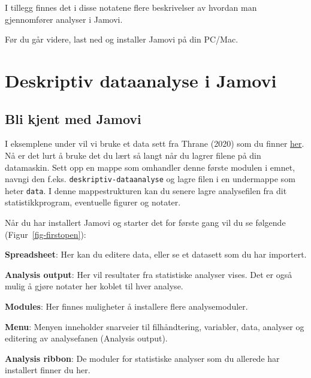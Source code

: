 \documentclass[
  letterpaper,
  DIV=11,
  numbers=noendperiod,
  oneside]{scrreprt}
\begin{document}
I tillegg finnes det i disse notatene flere beskrivelser av hvordan man
gjennomfører analyser i Jamovi.

Før du går videre, last ned og installer Jamovi på din PC/Mac.

\hypertarget{deskriptiv-dataanalyse-i-jamovi}{%
\chapter{Deskriptiv dataanalyse i
Jamovi}\label{deskriptiv-dataanalyse-i-jamovi}}

\hypertarget{bli-kjent-med-jamovi}{%
\section{Bli kjent med Jamovi}\label{bli-kjent-med-jamovi}}

I eksemplene under vil vi bruke et data sett fra Thrane
(2020)
som du finner \href{data/fotball_1_2_3.csv}{her}. Nå er det lurt å bruke
det du lært så langt når du lagrer filene på din datamaskin. Sett opp en
mappe som omhandler denne første modulen i emnet, navngi den f.eks.
\texttt{deskriptiv-dataanalyse} og lagre filen i en undermappe som heter
\texttt{data}. I denne mappestrukturen kan du senere lagre analysefilen
fra dit statistikkprogram, eventuelle figurer og notater.

Når du har installert Jamovi og starter det for første gang vil du se
følgende (Figur~\ref{fig-firstopen}):

{\textbf{Spreadsheet}}: Her kan du editere data, eller se et datasett
som du har importert.

{\textbf{Analysis output}}: Her vil resultater fra statistiske analyser
vises. Det er også mulig å gjøre notater her koblet til hver analyse.

{\textbf{Modules}}: Her finnes muligheter å installere flere
analysemoduler.

{\textbf{Menu}}: Menyen inneholder snarveier til filhåndtering,
variabler, data, analyser og editering av analysefanen (Analysis
output).

{\textbf{Analysis ribbon}}: De moduler for statistiske analyser som du
allerede har installert finner du her.
\end{document}
